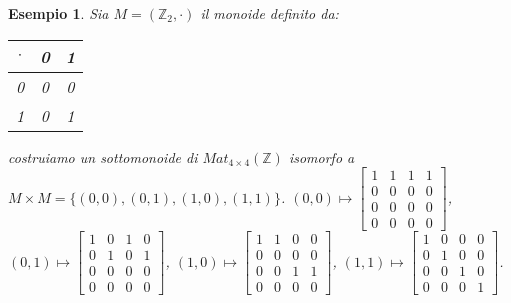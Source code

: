 \documentclass[a4paper,12pt]{article}
\theoremstyle{def}
\theoremstyle{prop}
\theoremstyle{esempio}
\newtheorem*{example}{Esempio}
\theoremstyle{dimostrazione}
\theoremstyle{teo}
\theoremstyle{osservazione}
\begin{document}
\newpage
\begin{example}
    Sia \(M = (\mathbb{Z}_2, \cdot)\) il monoide definito da:
    \begin{table}[htbp]
        \centering
        \begin{tabular}{|c|c|c|}
            \hline
            \(\cdot\) & 0 & 1 \\ \hline
            0         & 0 & 0 \\ \hline
            1         & 0 & 1 \\ \hline
        \end{tabular}
    \end{table}
    \newline costruiamo un sottomonoide di \(Mat_{4 \times 4}(\mathbb{Z})\) isomorfo a \(M \times M = \{(0,0), (0,1),
    (1,0),(1,1)\}\).\newline
    \newline\((0,0) \mapsto
    \begin{bmatrix}
        1 & 1 & 1 & 1 \\
        0 & 0 & 0 & 0 \\
        0 & 0 & 0 & 0 \\
        0 & 0 & 0 & 0
    \end{bmatrix}\),
    \((0,1) \mapsto \begin{bmatrix}
        1 & 0 & 1 & 0 \\
        0 & 1 & 0 & 1 \\
        0 & 0 & 0 & 0 \\
        0 & 0 & 0 & 0
    \end{bmatrix} \),
    \((1,0) \mapsto \begin{bmatrix}
        1 & 1 & 0 & 0 \\
        0 & 0 & 0 & 0 \\
        0 & 0 & 1 & 1 \\
        0 & 0 & 0 & 0
    \end{bmatrix} \),
    \((1,1) \mapsto \begin{bmatrix}
        1 & 0 & 0 & 0 \\
        0 & 1 & 0 & 0 \\
        0 & 0 & 1 & 0 \\
        0 & 0 & 0 & 1
    \end{bmatrix} \).\newline


\end{example}
\end{document}

